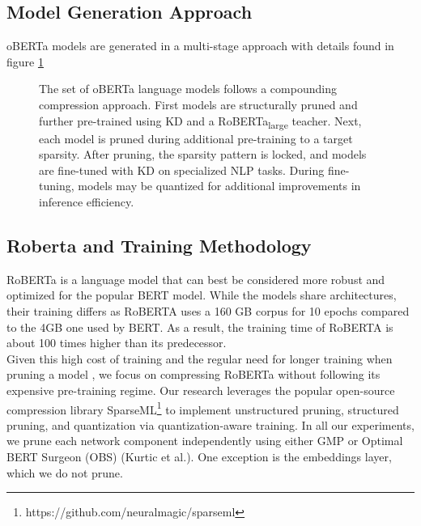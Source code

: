 \label{sec:appendix}
\subsection{Model Generation Approach}
oBERTa models are generated in a multi-stage approach with details found in figure \ref{fig:framework}
\begin{figure}[!t]
    \centering
    \caption{The set of oBERTa language models follows a compounding compression approach. First models are structurally pruned and further pre-trained using KD and a RoBERTa\textsubscript{large}  teacher. Next, each model is pruned during additional pre-training to a target sparsity. After  pruning, the sparsity pattern is locked, and models are fine-tuned with KD on specialized NLP tasks. During fine-tuning, models may be quantized for additional improvements in inference efficiency.}
    \label{fig:framework}
\end{figure}
\subsection{Roberta and Training Methodology}
RoBERTa \cite{Liu2019RoBERTaAR} is a language model that can best be considered more robust and optimized for the popular BERT model. While the models share architectures, their training differs as RoBERTA uses a 160 GB corpus for 10 epochs compared to the 4GB one used by BERT. As a result, the training time of RoBERTA is about 100 times higher than its predecessor.\\
Given this high cost of training and the regular need for longer training when pruning a model \cite{Kurti2022TheOB}, we focus on compressing RoBERTa without following its expensive pre-training regime. Our research leverages the popular open-source compression library SparseML\footnote{https://github.com/neuralmagic/sparseml} to implement unstructured pruning, structured pruning, and quantization via quantization-aware training. In all our experiments, we prune each network component independently using either GMP or Optimal BERT Surgeon (OBS) (Kurtic et al.). One exception is the embeddings layer, which we do not prune.\\
